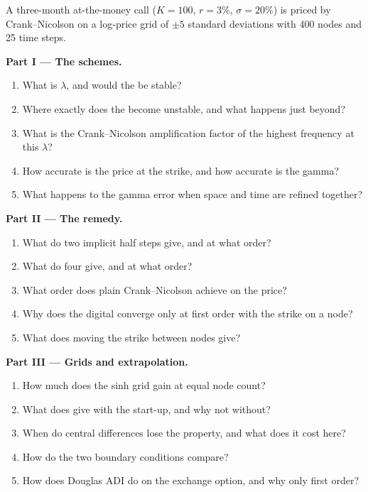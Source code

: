 \begin{problem}\label{pb:qm:finite-difference-methods:1}
A three-month at-the-money call ($K = 100$, $r = 3\%$, $\sigma = 20\%$) is priced by Crank--Nicolson on a log-price grid of $\pm5$ standard deviations with 400 nodes and 25 time steps.

\medskip\noindent\textbf{Part I --- The schemes.}
\begin{enumerate}
\item What is $\lambda$, and would the  be stable?
\item Where exactly does the  become unstable, and what happens just beyond?
\item What is the Crank--Nicolson amplification factor of the highest frequency at this $\lambda$?
\item How accurate is the price at the strike, and how accurate is the gamma?
\item What happens to the gamma error when space and time are refined together?
\end{enumerate}

\medskip\noindent\textbf{Part II --- The remedy.}
\begin{enumerate}[resume]
\item What do two implicit half steps give, and at what order?
\item What do four give, and at what order?
\item What order does plain Crank--Nicolson achieve on the price?
\item Why does the digital converge only at first order with the strike on a node?
\item What does moving the strike between nodes give?
\end{enumerate}

\medskip\noindent\textbf{Part III --- Grids and extrapolation.}
\begin{enumerate}[resume]
\item How much does the sinh grid gain at equal node count?
\item What does  give with the start-up, and why not without?
\item When do central differences lose the  property, and what does it cost here?
\item How do the two boundary conditions compare?
\item How does Douglas ADI do on the exchange option, and why only first order?
\end{enumerate}


\end{problem}
